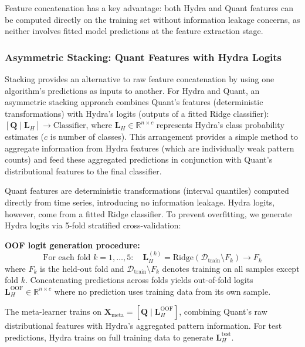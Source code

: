 \documentclass[pdflatex,sn-basic]{sn-jnl}           %
\theoremstyle{thmstyleone}%
\theoremstyle{thmstyletwo}%
\theoremstyle{thmstylethree}%
\begin{document}
Feature concatenation has a key advantage: both Hydra and Quant features can be computed directly on the training set without information leakage concerns, as neither involves fitted model predictions at the feature extraction stage.

\subsubsection{Asymmetric Stacking: Quant Features with Hydra Logits}

Stacking \citep{stacked-generalization} provides an alternative to raw feature concatenation by using one algorithm's predictions as inputs to another. For Hydra and Quant, an asymmetric stacking approach combines Quant's features (deterministic transformations) with Hydra's logits (outputs of a fitted Ridge classifier): $[\mathbf{Q} \mid \mathbf{L}_H] \rightarrow \text{Classifier}$, where $\mathbf{L}_H \in \mathbb{R}^{n \times c}$ represents Hydra's class probability estimates ($c$ is number of classes). This arrangement provides a simple method to aggregate information from Hydra features (which are individually weak pattern counts) and feed these aggregated predictions in conjunction with Quant's distributional features to the final classifier.

Quant features are deterministic transformations (interval quantiles) computed directly from time series, introducing no information leakage. Hydra logits, however, come from a fitted Ridge classifier. To prevent overfitting, we generate Hydra logits via 5-fold stratified cross-validation:

\textbf{OOF logit generation procedure:}
\begin{equation}
\text{For each fold } k = 1, \ldots, 5: \quad \mathbf{L}_H^{(k)} = \text{Ridge}(\mathcal{D}_{\text{train}} \setminus F_k) \rightarrow F_k
\end{equation}
where $F_k$ is the held-out fold and $\mathcal{D}_{\text{train}} \setminus F_k$ denotes training on all samples except fold $k$. Concatenating predictions across folds yields out-of-fold logits $\mathbf{L}_H^{\text{OOF}} \in \mathbb{R}^{n \times c}$ where no prediction uses training data from its own sample.

The meta-learner trains on $\mathbf{X}_{\text{meta}} = [\mathbf{Q} \mid \mathbf{L}_H^{\text{OOF}}]$, combining Quant's raw distributional features with Hydra's aggregated pattern information. For test predictions, Hydra trains on full training data to generate $\mathbf{L}_H^{\text{test}}$.
\end{document}
